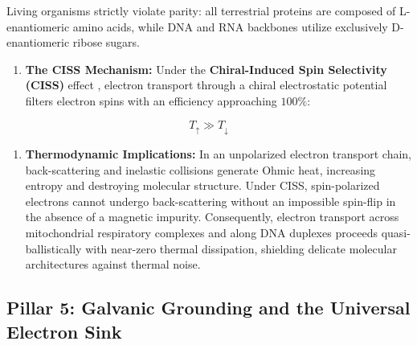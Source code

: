 \documentclass[10pt,twocolumn]{article}
\begin{document}
Living organisms strictly violate parity: all terrestrial proteins are composed of L-enantiomeric amino acids, while DNA and RNA backbones utilize exclusively D-enantiomeric ribose sugars.
\begin{enumerate}
  \item \textbf{The CISS Mechanism:} Under the \textbf{Chiral-Induced Spin Selectivity (CISS)} effect \cite{Naaman2012}, electron transport through a chiral electrostatic potential filters electron spins with an efficiency approaching $100\%$:
\end{enumerate}
\begin{equation}
  T_{\uparrow} \gg T_{\downarrow}
\end{equation}
\begin{enumerate}
  \item \textbf{Thermodynamic Implications:} In an unpolarized electron transport chain, back-scattering and inelastic collisions generate Ohmic heat, increasing entropy and destroying molecular structure. Under CISS, spin-polarized electrons cannot undergo back-scattering without an impossible spin-flip in the absence of a magnetic impurity. Consequently, electron transport across mitochondrial respiratory complexes and along DNA duplexes proceeds quasi-ballistically with near-zero thermal dissipation, shielding delicate molecular architectures against thermal noise.
\end{enumerate}


\subsection{Pillar 5: Galvanic Grounding and the Universal Electron Sink}
\end{document}
